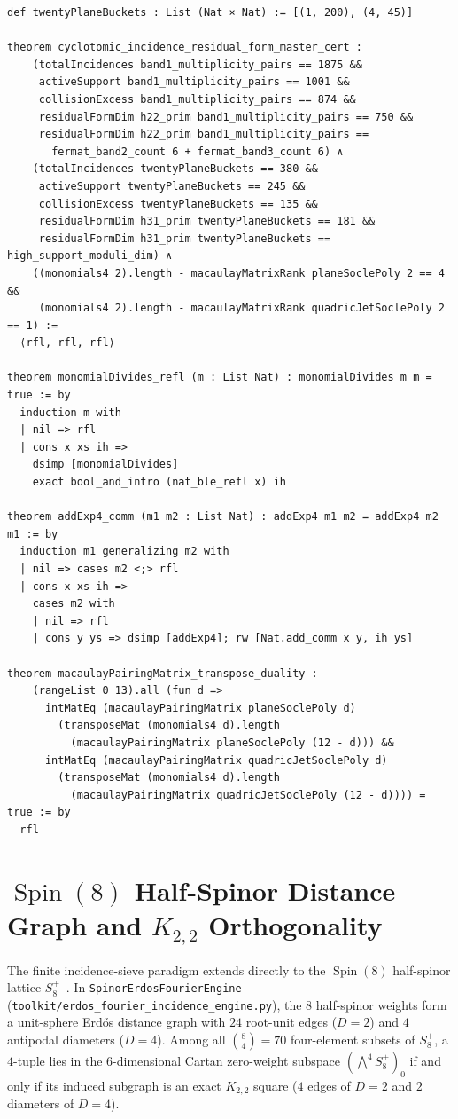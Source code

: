 \documentclass[11pt,a4paper]{article}
\begin{document}
\begin{lstlisting}[caption={Master three-level sieve certificate and Macaulay transpose duality.}]
def twentyPlaneBuckets : List (Nat × Nat) := [(1, 200), (4, 45)]

theorem cyclotomic_incidence_residual_form_master_cert :
    (totalIncidences band1_multiplicity_pairs == 1875 &&
     activeSupport band1_multiplicity_pairs == 1001 &&
     collisionExcess band1_multiplicity_pairs == 874 &&
     residualFormDim h22_prim band1_multiplicity_pairs == 750 &&
     residualFormDim h22_prim band1_multiplicity_pairs ==
       fermat_band2_count 6 + fermat_band3_count 6) ∧
    (totalIncidences twentyPlaneBuckets == 380 &&
     activeSupport twentyPlaneBuckets == 245 &&
     collisionExcess twentyPlaneBuckets == 135 &&
     residualFormDim h31_prim twentyPlaneBuckets == 181 &&
     residualFormDim h31_prim twentyPlaneBuckets == high_support_moduli_dim) ∧
    ((monomials4 2).length - macaulayMatrixRank planeSoclePoly 2 == 4 &&
     (monomials4 2).length - macaulayMatrixRank quadricJetSoclePoly 2 == 1) :=
  ⟨rfl, rfl, rfl⟩

theorem monomialDivides_refl (m : List Nat) : monomialDivides m m = true := by
  induction m with
  | nil => rfl
  | cons x xs ih =>
    dsimp [monomialDivides]
    exact bool_and_intro (nat_ble_refl x) ih

theorem addExp4_comm (m1 m2 : List Nat) : addExp4 m1 m2 = addExp4 m2 m1 := by
  induction m1 generalizing m2 with
  | nil => cases m2 <;> rfl
  | cons x xs ih =>
    cases m2 with
    | nil => rfl
    | cons y ys => dsimp [addExp4]; rw [Nat.add_comm x y, ih ys]

theorem macaulayPairingMatrix_transpose_duality :
    (rangeList 0 13).all (fun d =>
      intMatEq (macaulayPairingMatrix planeSoclePoly d)
        (transposeMat (monomials4 d).length
          (macaulayPairingMatrix planeSoclePoly (12 - d))) &&
      intMatEq (macaulayPairingMatrix quadricJetSoclePoly d)
        (transposeMat (monomials4 d).length
          (macaulayPairingMatrix quadricJetSoclePoly (12 - d)))) = true := by
  rfl
\end{lstlisting}

\section{\texorpdfstring{$\operatorname{Spin}(8)$}{Spin(8)} Half-Spinor Distance Graph and \texorpdfstring{$K_{2,2}$}{K2,2} Orthogonality}

The finite incidence-sieve paradigm extends directly to the $\operatorname{Spin}(8)$ half-spinor lattice $S^+_8$~\cite{Mumford1969,Weil1977}. In \texttt{SpinorErdosFourierEngine} (\texttt{toolkit/erdos\_fourier\_incidence\_engine.py}), the $8$ half-spinor weights form a unit-sphere Erdős distance graph with $24$ root-unit edges ($D = 2$) and $4$ antipodal diameters ($D = 4$). Among all $\binom{8}{4} = 70$ four-element subsets of $S^+_8$, a $4$-tuple lies in the $6$-dimensional Cartan zero-weight subspace $(\bigwedge^4 S^+_8)_0$ if and only if its induced subgraph is an exact $K_{2,2}$ square ($4$ edges of $D = 2$ and $2$ diameters of $D = 4$).
\end{document}
